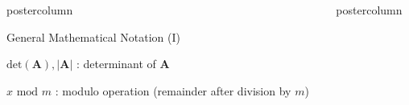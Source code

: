 \documentclass{beamer}
\newlength{\columnheight} %
\begin{document}
\begin{frame}[fragile]{}
\begin{columns}
\begin{column}{.31\textwidth}
\begin{beamercolorbox}[center]{postercolumn}
\begin{minipage}{.98\textwidth}
{\begin{myblock}{General Mathematical Notation (I)}
						\\
						\begin{codebox}
						    $\text{det}\left(\bm{A}\right), |\bm{A}|$ : determinant of $\bm{A}$
						\end{codebox}
						\hspace*{1ex}
						\begin{codebox}
							$x \text{ mod } m$ : modulo operation (remainder after division by $m$)
						\end{codebox}
					\end{myblock}
				}
			\end{minipage}
		\end{beamercolorbox}
	\end{column}
	\begin{column}{.31\textwidth}
		\begin{beamercolorbox}[center]{postercolumn}
			\begin{minipage}{.98\textwidth}
				\parbox[t][\columnheight]{\textwidth}{


}
\end{minipage}
\end{beamercolorbox}
\end{column}
\end{columns}
\end{frame}
\end{document}
